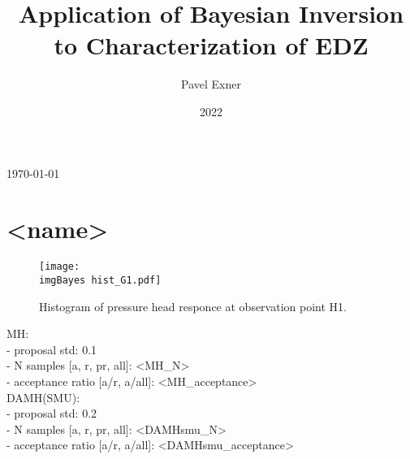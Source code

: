 \documentclass{article}
\title{Application of Bayesian Inversion to Characterization of EDZ}
\author{Pavel Exner}
\date{2022}
\newcommand{\imgBayes}{saved_samples/config_mcmc_bayes/img_Bayes/}
\begin{document}
\begin{center}
\today
\end{center}

\section{<name>}


\begin{figure}[htb!]
    \centering
    \texttt{[image: \\imgBayes hist\_G1.pdf]}
    \caption{Histogram of pressure head responce at observation point H1.}
    \label{fig:hist_G1}
\end{figure}


\cleardoublepage

\large


\vspace{10pt}
MH:\\
- proposal std: 0.1\\
- N samples [a, r, pr, all]: <MH_N>\\
- acceptance ratio [a/r, a/all]: <MH_acceptance>\\

DAMH(SMU):\\
- proposal std: 0.2\\
- N samples [a, r, pr, all]: <DAMHsmu_N>\\
- acceptance ratio [a/r, a/all]: <DAMHsmu_acceptance>\\

\end{document}
